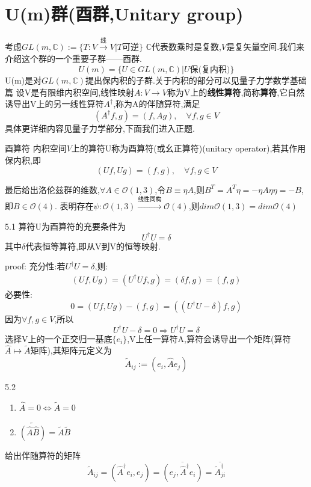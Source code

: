 \documentclass[../main.tex]{subfiles}
\begin{document}
\section{U(m)群(酉群,Unitary group)}
考虑$GL(m,\mathbb{C}):= \{T:V\xrightarrow{\text{线}}V|T\text{可逆}\}$ $\mathbb{C}$代表数乘时是复数,$V$是复矢量空间.我们来介绍这个群的一个重要子群——酉群.
$$U(m) = \{U\in GL(m, \mathbb{C})|U\text{保(复内积)}\}$$
U(m)是对$GL(m,\mathbb{C})$提出保内积的子群.关于内积的部分可以见量子力学数学基础篇%
设V是有限维内积空间,线性映射$A:V\rightarrow V$称为V上的\textbf{线性算符},简称\textbf{算符},它自然诱导出V上的另一线性算符$A^\dagger$,称为A的伴随算符,满足
$$(A^\dagger f,g) = (f,Ag),\quad \forall f,g \in V$$
具体更详细内容见量子力学部分,下面我们进入正题.
\begin{definition}{}{酉算符}
    内积空间$V$上的算符U称为酉算符(或幺正算符)(unitary operator),若其作用保内积,即
    $$(Uf,Ug)=(f,g), \quad \forall f,g \in V$$
\end{definition}最后给出洛伦兹群的维数,$\forall A \in \mathscr{O}(1,3)$,令$B \equiv \eta A$,则$B^T = A^T \eta = -\eta A \eta \eta = -B$,即$B \in \mathscr{O}(4)$.
表明存在$\psi:\mathscr{O}(1,3) \xrightarrow{\text{线性同构}}  \mathscr{O}(4)$,则$dim\mathscr{O}(1,3) = dim\mathscr{O}(4)$
\begin{theorem}{}{5.1}
    算符U为酉算符的充要条件为$$U^\dagger U =\delta$$其中$\delta$代表恒等算符,即从V到V的恒等映射.
\end{theorem}
proof: 充分性:若$U^\dagger U = \delta$,则:
\begin{align*}
    (Uf,Ug) = (U^\dagger Uf,g) = (\delta f,g) = (f,g)
\end{align*}
必要性:\begin{equation*}
   0 = (Uf,Ug) - (f,g) = ((U^\dagger U - \delta)f,g) 
\end{equation*}
因为$\forall f,g \in V$,所以
$$U^\dagger U - \delta = 0 \Longrightarrow U^\dagger U = \delta$$
选择V上的一个正交归一基底$\{e_i\}$,V上任一算符A,算符会诱导出一个矩阵(算符$\hat{A}\mapsto \tilde{A}$矩阵),其矩阵元定义为
$$\tilde{A}_{ij} := (e_i,\hat{A}e_j)$$
\begin{theorem}{}{5.2}
    \begin{enumerate}
        \item $\hat{A} = 0 \Longleftrightarrow \tilde{A} = 0$
        \item $\widetilde{(\hat{A}\hat{B})} =  \tilde{A}\tilde{B}$
    \end{enumerate}
\end{theorem}
给出伴随算符的矩阵
$$\tilde{A}_{ij} = (\hat{A}^\dagger e_i,e_j) = \overline{(e_j,\hat{A}^\dagger e_i)} = \overline{\tilde{A}^\dagger _{ji}}$$
\end{document}
